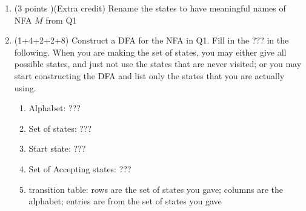 \documentclass[10pt]{article}
\begin{document}
\begin{enumerate}
\item (3 points
)(Extra credit) Rename the states to have meaningful names of NFA $M$ from Q1
 \newpage 
 
\item (1+4+2+2+8) Construct a DFA for the  NFA in Q1.
Fill in the ??? in the following. 
When you are making the set of states, you may either give all possible states, and just not use the states that are never visited; or you may start constructing the DFA and list only the states that you are actually using. 
\begin{enumerate}
    \item Alphabet: ??? 
    \item Set of states: ???
    \item Start state: ???
    \item Set of Accepting states: ??? 
    \item transition table: rows are the set of states you gave; columns are the alphabet; entries are from the set of states you gave
\end{enumerate}
\end{enumerate}
\end{document}
